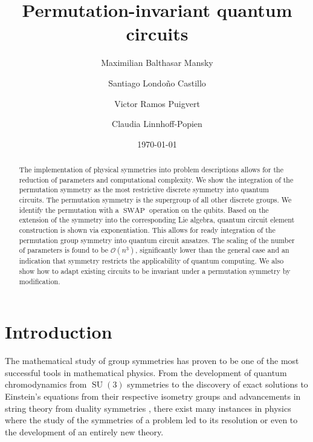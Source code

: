 \documentclass[%
 reprint,
 amsmath,amssymb,
 aps,
]{revtex4-2}
\newcommand{\SWAP}{\operatorname{SWAP}}
\theoremstyle{definition}%
\begin{document}

\title{Permutation-invariant quantum circuits}

\author{Maximilian Balthasar Mansky}%
 \author{Santiago Londoño Castillo}
 \author{Victor Ramos Puigvert}
\author{Claudia Linnhoff-Popien}

\date{\today}%

\begin{abstract}
The implementation of physical symmetries into problem descriptions allows for the reduction of parameters and computational complexity. We show the integration of the permutation symmetry as the most restrictive discrete symmetry into quantum circuits. The permutation symmetry is the supergroup of all other discrete groups. We identify the permutation with a $\SWAP$ operation on the qubits. Based on the extension of the symmetry into the corresponding Lie algebra, quantum circuit element construction is shown via exponentiation. This allows for ready integration of the permutation group symmetry into quantum circuit ansatzes. The scaling of the number of parameters is found to be $\mathcal{O}(n^3)$, significantly lower than the general case and an indication that symmetry restricts the applicability of quantum computing. We also show how to adapt existing circuits to be invariant under a permutation symmetry by modification.
\end{abstract}


\maketitle




\section{Introduction}
The mathematical study of group symmetries has proven to be one of the most successful tools in mathematical physics. From the development of quantum chromodynamics \cite{Gell-Mann:1961omu} from $\operatorname{SU}(3)$ symmetries to the discovery of exact solutions to Einstein's equations from their respective isometry groups \cite{Stephani:2003tm} and advancements in string theory from duality symmetries \cite{delaOssa:1992vci}, there exist many instances in physics where the study of the symmetries of a problem led to its resolution or even to the development of an entirely new theory.
\end{document}
